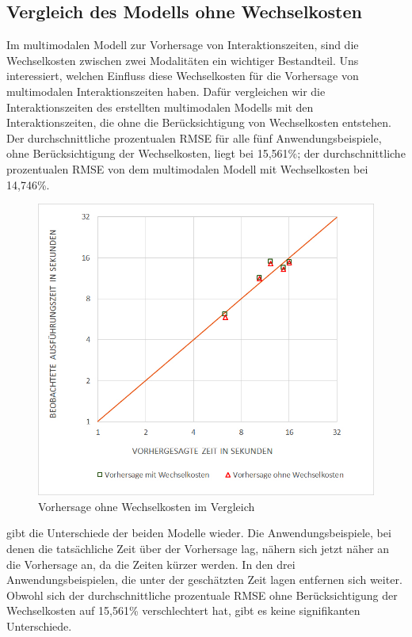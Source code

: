 \subsection{Vergleich des Modells ohne Wechselkosten}
Im multimodalen Modell zur Vorhersage von Interaktionszeiten, sind die Wechselkosten zwischen zwei Modalitäten ein wichtiger Bestandteil. 
Uns interessiert, welchen Einfluss diese Wechselkosten für die Vorhersage von multimodalen Interaktionszeiten haben. 
Dafür vergleichen wir die Interaktionszeiten des erstellten multimodalen Modells mit den Interaktionszeiten, die ohne die Berücksichtigung von Wechselkosten entstehen.
Der durchschnittliche prozentualen RMSE für alle fünf Anwendungsbeispiele, ohne Berücksichtigung der Wechselkosten, liegt bei 15,561\%; der durchschnittliche prozentualen RMSE von dem multimodalen Modell mit Wechselkosten bei 14,746\%. 
\begin{figure}[ht]
	\centering
		\includegraphics[width=1\textwidth]{img/Vorhersagezeit_ohne_Wechselkosten.jpg}
	\caption[Interaktionszeiten ohne Wechselkosten]{Vorhersage ohne Wechselkosten im Vergleich}
	\label{fig:Vorhersagezeit_ohne_Wechselkosten}
\end{figure}
 gibt die Unterschiede der beiden Modelle wieder. 
Die Anwendungsbeispiele, bei denen die tatsächliche Zeit über der Vorhersage lag, nähern sich jetzt näher an die Vorhersage an, da die Zeiten kürzer werden.
In den drei Anwendungsbeispielen, die unter der geschätzten Zeit lagen entfernen sich weiter. 
Obwohl sich der durchschnittliche prozentuale RMSE ohne Berücksichtigung der Wechselkosten auf 15,561\% verschlechtert hat, gibt es keine signifikanten Unterschiede.
 

